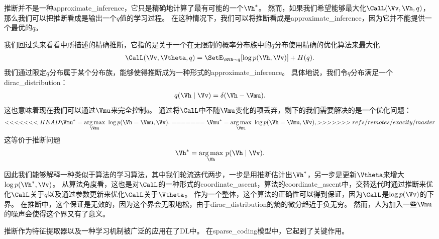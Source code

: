 推断并不是一种\gls{approximate_inference}，它只是精确地计算了最有可能的一个$\Vh^*$。
然而，如果我们希望能够最大化$\CalL(\Vv,\Vh,q)$，那么我们可以把推断看成是输出一个$q$值的学习过程。%
在这种情况下，我们可以将推断看成是\gls{approximate_inference}，因为它并不能提供一个最优的$q$。



我们回过头来看看中所描述的精确推断，它指的是关于一个在无限制的概率分布族中的$q$分布使用精确的优化算法来最大化
\begin{align}
\CalL(\Vv,{\Vtheta},q)
 = \SetE_{\RVh\sim q}[\log p(\Vh , \Vv)] + H(q).
\end{align}
我们通过限定$q$分布属于某个分布族，能够使得推断成为一种形式的\gls{approximate_inference}。
具体地说，我们令$q$分布满足一个\gls{dirac_distribution}：
\begin{align}
q(\Vh\mid\Vv) = \delta(\Vh - {\Vmu}).
\end{align}
这也意味着现在我们可以通过$\Vmu$来完全控制$q$。
通过将$\CalL$中不随$\Vmu$变化的项丢弃，剩下的我们需要解决的是一个优化问题：
\begin{align}
<<<<<<< HEAD
\Vmu^*  =  \underset{\Vmu}{\arg\max}\ \log p(\Vh = \Vmu,\Vv).
=======
\Vmu^*  =  \underset{\Vmu}{\arg\max}\ \log p(\Vh = \Vmu,\Vv),
>>>>>>> refs/remotes/exacity/master
\end{align}
这等价于推断问题
\begin{align}
\Vh^* = \underset{\Vh}{\arg\max}\  p(\Vh\mid\Vv).
\end{align}




因此我们能够解释一种类似于算法的学习算法，其中我们轮流迭代两步，一步是用推断估计出$\Vh^*$，另一步是更新$\Vtheta$来增大$\log p(\Vh^*,\Vv)$。
从算法角度看，这也是对$\CalL$的一种形式的\gls{coordinate_ascent}，算法的\gls{coordinate_ascent}中，交替迭代时通过推断来优化$\CalL$关于$q$以及通过参数更新来优化$\CalL$关于$\Vtheta$。
作为一个整体，这个算法的正确性可以得到保证，因为$\CalL$是$\log p(\Vv)$的下界。
在推断中，这个保证是无效的，因为这个界会无限地松，由于\gls{dirac_distribution}的熵的微分趋近于负无穷。
然而，人为加入一些$\Vmu$的噪声会使得这个界又有了意义。



推断作为特征提取器以及一种学习机制被广泛的应用在了\gls{DL}中。
在\gls{sparse_coding}模型中，它起到了关键作用。


